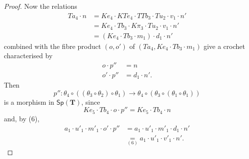 \documentclass[fleqn]{article}
\newcommand{\TT}{\mathbf{T}}
\newcommand{\Cat}[1]{\mathsf{#1}}
\newcommand{\Sp}[1]{\Cat{Sp}(#1)}
\begin{document}
\begin{proof}
  Now the relations
  \[
    \begin{aligned}
      Ta_4\cdot n
      &= Ke_4\cdot KTe_4\cdot TTb_3\cdot Tu_2\cdot v_1\cdot n'
    \\&= Ke_4\cdot Tb_3\cdot K\pi_3\cdot Tu_2\cdot v_1\cdot n'
    \\&= (Ke_4\cdot Tb_3\cdot m_1)\cdot d_1\cdot n'
    \end{aligned}
  \]
  combined with the fibre product $(o,o')$ of $(Ta_4,Ke_4\cdot Tb_3\cdot m_1)$ give a crochet characterised by
  \[
    \begin{aligned}
      o\cdot p''
      &= n
    \\o'\cdot p''
      &= d_1\cdot n'.
    \end{aligned}
    \tag{7}
  \]
  Then
  \[
    p''\colon\theta_4\circ((\theta_3\circ\theta_2)\circ\theta_1)
    \to \theta_4\circ(\theta_3\circ(\theta_1\circ\theta_1))
  \]
  is a morphism in $\Sp{\TT}$, since
  \[
    Ke_5\cdot Tb_4\cdot o\cdot p''
    = Ke_5\cdot Tb_4\cdot n
  \]
  and, by (6),
  \[
    \begin{aligned}
      a_1\cdot u'_1\cdot m'_1\cdot o'\cdot p''
      &= a_1\cdot u'_1\cdot m'_1\cdot d_1\cdot n'
    \\&\underset{(6)}{=} a_1\cdot u'_1\cdot v'_1\cdot n'.
    \end{aligned}
  \]

  \medskip


\end{proof}
\end{document}
